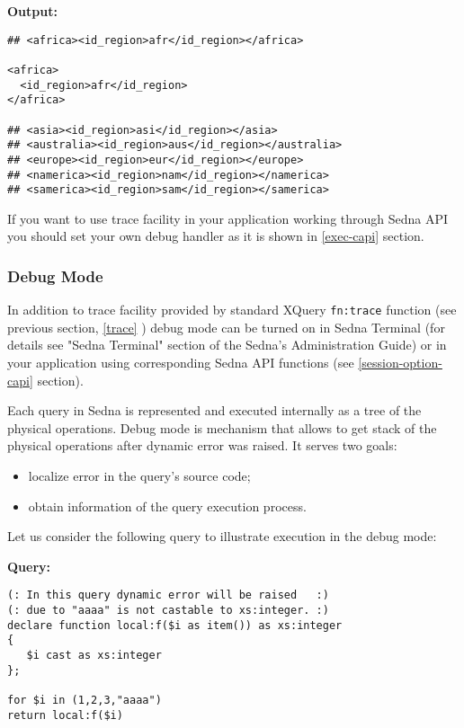 \documentclass[a4paper,12pt]{article}
\newenvironment{citemize}
{\begin{itemize}
  \setlength{\itemsep}{0pt}
  \setlength{\parskip}{0pt}
  \setlength{\parsep}{0pt}}
{\end{itemize}}
\begin{document}
\medskip
\noindent
\textbf{Output:}

\small{
\begin{verbatim}
## <africa><id_region>afr</id_region></africa>

<africa>
  <id_region>afr</id_region>
</africa>

## <asia><id_region>asi</id_region></asia>
## <australia><id_region>aus</id_region></australia>
## <europe><id_region>eur</id_region></europe>
## <namerica><id_region>nam</id_region></namerica>
## <samerica><id_region>sam</id_region></samerica>
\end{verbatim}}

If you want to use trace facility in your application working through Sedna API
you should set your own debug handler as it is shown in \ref{exec-capi} section.


\subsubsection{Debug Mode}
\label{debug-mode}

In addition to trace facility provided by standard XQuery \verb!fn:trace!
function (see previous section, \ref{trace} ) debug mode can be turned on in
Sedna Terminal (for details see "Sedna Terminal" section of the Sedna's
Administration Guide) or in your application using corresponding Sedna API
functions (see \ref{session-option-capi} section).

Each query in Sedna is represented and executed internally as a tree of the
physical operations. Debug mode is mechanism that allows to get stack of the
physical operations after dynamic error was raised. It serves two goals:

\begin{citemize}
\item localize error in the query's source code;
\item obtain information of the query execution process.
\end{citemize}

Let us consider the following query to illustrate execution in the debug mode:

\medskip
\noindent
\textbf{Query:}

\begin{verbatim}
(: In this query dynamic error will be raised   :)
(: due to "aaaa" is not castable to xs:integer. :)
declare function local:f($i as item()) as xs:integer
{
   $i cast as xs:integer
};

for $i in (1,2,3,"aaaa")
return local:f($i)
\end{verbatim}
\end{document}

